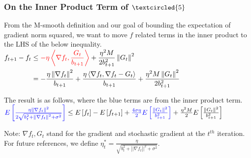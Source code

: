 \documentclass{beamer}
\begin{document}
\begin{frame}
\frametitle{On the Inner Product Term of $\textcircled{5}$}

    From the M-smooth definition and our goal of bounding the expectation of gradient norm squared, we want to move $f$ related terms in the inner product to the LHS of the below inequality.
    $\begin{aligned} f_{t+1}-f_t & \leq\color{red}-\eta\left\langle\nabla f_t, \frac{G_t}{b_{t+1}}\right\rangle\color{black}+\frac{\eta^2 M}{2 b_{t+1}^2}\left\|G_t\right\|^2 \\ & =-\frac{\eta\left\|\nabla f_t\right\|^2}{b_{t+1}}+\frac{\eta\left\langle\nabla f_t, \nabla f_t-G_t\right\rangle}{b_{t+1}}+\frac{\eta^2 M\left\|G_t\right\|^2}{2 b_{t+1}^2}\end{aligned}$
    
    The result is as follows, where the blue terms are from the inner product term. 
    $\color{blue}E\left[\frac{\eta\left\|\nabla f_t\right\|^2}{2 \sqrt{b_t^2+\left\|\nabla f_t\right\|^2+\sigma^2}}\right]\color{black} \leq E\left[f_t\right]-E\left[f_{t+1}\right]+\color{blue}\frac{4 \sigma\eta}{2} E\left[\frac{\left\|G_t\right\|^2}{b_{t+1}^2}\right] \color{black}+ \frac{\eta^2 M}{2} E\left[\frac{\left\|G_t\right\|^2}{b_{t+1}^2}\right]$\par
    Note: $\nabla f_t, G_t$ stand for the gradient and stochastic gradient at the $t^{th}$ iteration. For future references, we define $\eta_t^* = \frac{\eta}{\sqrt{b_t^2+\left||\nabla f_t\right||^2+\sigma^2}}$.
\end{frame}
\end{document}
